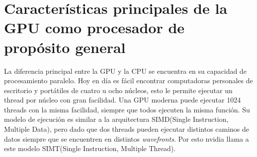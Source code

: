 
\chapter{Características principales de la GPU como procesador de propósito
general}

La diferencia principal entre la GPU y la CPU se encuentra en su capacidad de
procesamiento paralelo. Hoy en día es fácil encontrar computadoras personales de
escritorio y portátiles de cuatro u ocho núcleos, esto le permite ejecutar un
thread por núcleo con gran facilidad. Una GPU moderna puede ejecutar 1024
threads con la misma facilidad, siempre que todos ejecuten la misma función. Su
modelo de ejecución es similar a la arquitectura SIMD(Single Instruction,
Multiple Data), pero dado que dos threads pueden ejecutar distintos caminos de
datos siempre que se encuentren en distintos \emph{wavefronts}. Por esto nvidia
llama a este modelo SIMT(Single Instruction, Multiple Thread).
